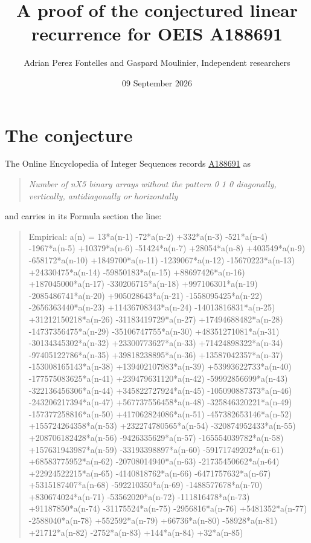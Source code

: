 \documentclass[11pt]{article}
\title{A proof of the conjectured linear recurrence for OEIS A188691}
\author{Adrian Perez Fontelles and Gaspard Moulinier, Independent researchers}
\date{09 September 2026}
\theoremstyle{definition}
\begin{document}
\maketitle
\section{The conjecture}

The Online Encyclopedia of Integer Sequences records \href{https://oeis.org/A188691}{A188691} as

\begin{quote}\itshape Number of nX5 binary arrays without the pattern 0 1 0 diagonally, vertically, antidiagonally or horizontally\end{quote}

and carries in its Formula section the line:

\begin{quote}\ttfamily Empirical: a(n) = 13*a(n-1) -72*a(n-2) +332*a(n-3) -521*a(n-4) -1967*a(n-5) +10379*a(n-6) -51424*a(n-7) +28054*a(n-8) +403549*a(n-9) -658172*a(n-10) +1849700*a(n-11) -1239067*a(n-12) -15670223*a(n-13) +24330475*a(n-14) -59850183*a(n-15) +88697426*a(n-16) +187045000*a(n-17) -330206715*a(n-18) +997106301*a(n-19) -2085486741*a(n-20) +905028643*a(n-21) -1558095425*a(n-22) -2656363440*a(n-23) +11436708343*a(n-24) -14013816831*a(n-25) +31212150218*a(n-26) -31183419729*a(n-27) +17494688482*a(n-28) -14737356475*a(n-29) -35106747755*a(n-30) +48351271081*a(n-31) -30134345302*a(n-32) +23300773627*a(n-33) +71424898322*a(n-34) -97405122786*a(n-35) +39818238895*a(n-36) +13587042357*a(n-37) -153008165143*a(n-38) +139402107983*a(n-39) +53993622733*a(n-40) -177575083625*a(n-41) +239479631120*a(n-42) -59992856699*a(n-43) -322136456306*a(n-44) +345822727924*a(n-45) -105090887373*a(n-46) -243206217394*a(n-47) +567737556458*a(n-48) -325846320221*a(n-49) -157377258816*a(n-50) +417062824086*a(n-51) -457382653146*a(n-52) +155724264358*a(n-53) +232274780565*a(n-54) -320874952433*a(n-55) +208706182428*a(n-56) -9426335629*a(n-57) -165554039782*a(n-58) +157631943987*a(n-59) -33193398897*a(n-60) -59171749202*a(n-61) +68583775952*a(n-62) -20708014940*a(n-63) -21735450662*a(n-64) +22924522215*a(n-65) -4140818762*a(n-66) -6471757632*a(n-67) +5315187407*a(n-68) -592210350*a(n-69) -1488577678*a(n-70) +830674024*a(n-71) -53562020*a(n-72) -111816478*a(n-73) +91187850*a(n-74) -31175524*a(n-75) -2956816*a(n-76) +5481352*a(n-77) -2588040*a(n-78) +552592*a(n-79) +66736*a(n-80) -58928*a(n-81) +21712*a(n-82) -2752*a(n-83) +144*a(n-84) +32*a(n-85)\end{quote}
\end{document}
